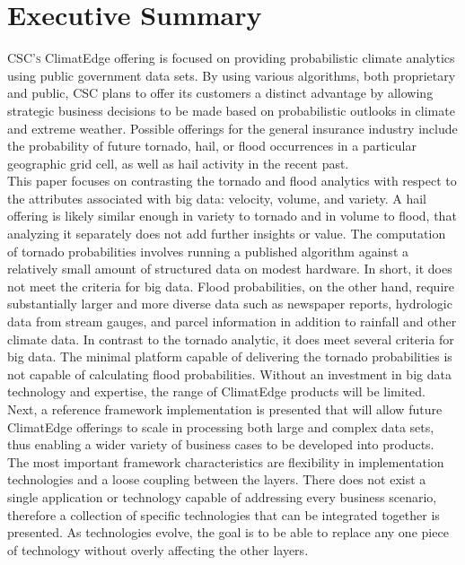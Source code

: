\section{Executive Summary}
\textsc{CSC's} ClimatEdge\texttrademark{} offering is focused on providing probabilistic climate analytics using public government data sets. By using various algorithms, both proprietary and public, \textsc{CSC} plans to offer its customers a distinct advantage by allowing strategic business decisions to be made based on probabilistic outlooks in climate and extreme weather. Possible offerings for the general insurance industry include the probability of future tornado, hail, or flood occurrences in a particular geographic grid cell, as well as hail activity in the recent past.\\

This paper focuses on contrasting the tornado and flood analytics with respect to the attributes associated with big data: velocity, volume, and variety. A hail offering is likely similar enough in variety to tornado and in volume to flood, that analyzing it separately does not add further insights or value. The computation of tornado probabilities involves running a published algorithm against a relatively small amount of structured data on modest hardware. In short, it does not meet the criteria for big data. Flood probabilities, on the other hand, require substantially larger and more diverse data such as newspaper reports, hydrologic data from stream gauges, and parcel information in addition to rainfall and other climate data. In contrast to the tornado analytic, it does meet several criteria for big data. The minimal platform capable of delivering the tornado probabilities is not capable of calculating flood probabilities. Without an investment in big data technology and expertise, the range of ClimatEdge products will be limited.\\

Next, a reference framework implementation is presented that will allow future ClimatEdge offerings to scale in processing both large and complex data sets, thus enabling a wider variety of business cases to be developed into products. The most important framework characteristics are flexibility in implementation technologies and a loose coupling between the layers. There does not exist a single application or technology capable of addressing every business scenario, therefore a collection of specific technologies that can be integrated together is presented. As technologies evolve, the goal is to be able to replace any one piece of technology without overly affecting the other layers.\\

